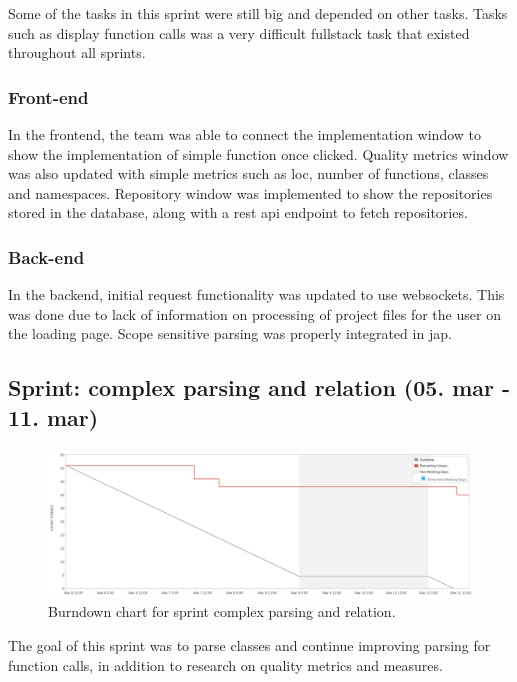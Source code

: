 Some of the tasks in this \gls{sprint} were still big and depended on other tasks. Tasks such as display function calls was a very difficult \gls{fullstack} task that existed throughout all \glspl{sprint}. 

\subsubsection{Front-end}
In the \gls{frontend}, the team was able to connect the implementation window to show the implementation of simple function once clicked. Quality metrics window was also updated with simple metrics such as \gls{loc}, number of functions, classes and \glspl{namespace}. Repository window was implemented to show the repositories stored in the database, along with a \gls{rest} \gls{api} endpoint to fetch repositories.

\subsubsection{Back-end}
In the \gls{backend}, initial request functionality was updated to use \glspl{websocket}. This was done due to lack of information on processing of project files for the user on the loading page. Scope sensitive parsing was properly integrated in \gls{jap}.

\subsection{Sprint: complex parsing and relation (05. mar - 11. mar)}
\begin{figure}[H] 
    \includegraphics[width=\textwidth]{inc/images/sprints/sprintComplexParsingandRelation050319-110319.png}
    \caption{Burndown chart for sprint complex parsing and relation.}
    \label{fig:sprintComplexParsingAndRelation}
\end{figure}

The goal of this \gls{sprint} was to parse classes and continue improving parsing for function calls, in addition to research on quality metrics and measures.


